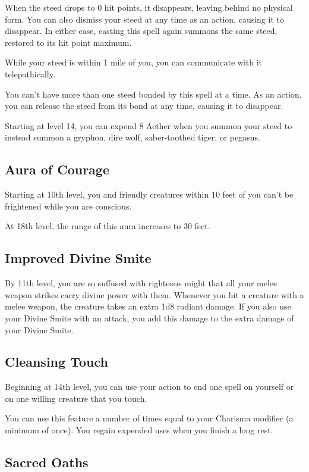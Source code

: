 When the steed drops to 0 hit points, it disappears, leaving behind no physical form. You can also dismiss your steed at any time as an action, causing it to disappear. In either case, casting this spell again summons the same steed, restored to its hit point maximum.

While your steed is within 1 mile of you, you can communicate with it telepathically.

You can't have more than one steed bonded by this spell at a time. As an action, you can release the steed from its bond at any time, causing it to disappear.

Starting at level 14, you can expend 8 Aether when you summon your steed to instead summon a gryphon, dire wolf, saber-toothed tiger, or pegasus.

\subsection{Aura of Courage}

Starting at 10th level, you and friendly creatures within 10 feet of you can't be frightened while you are conscious.

At 18th level, the range of this aura increases to 30 feet.

\subsection{Improved Divine Smite}

By 11th level, you are so suffused with righteous might that all your melee weapon strikes carry divine power with them. Whenever you hit a creature with a melee weapon, the creature takes an extra 1d8 radiant damage. If you also use your Divine Smite with an attack, you add this damage to the extra damage of your Divine Smite.

\subsection{Cleansing Touch}

Beginning at 14th level, you can use your action to end one spell on yourself or on one willing creature that you touch.

You can use this feature a number of times equal to your Charisma modifier (a minimum of once). You regain expended uses when you finish a long rest.

\subsection{Sacred Oaths}

